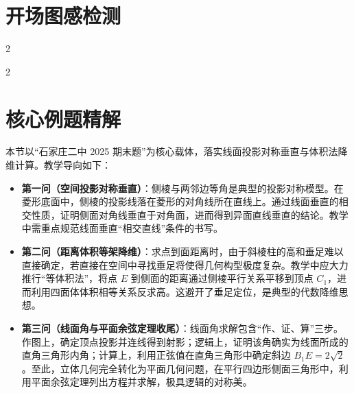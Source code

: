 \documentclass[11pt,a4paper]{ctexart}
\begin{document}
\newpage
\section{开场图感检测}

{\small \qSolidOpeningCubeRelationsStem}

\begin{paracol}{2}
\switchcolumn
{}
\end{paracol}

\par\vspace{1.0em}\par\vspace{1.0em}

{\small \qSolidOpeningPyramidProjectionStem}

\begin{paracol}{2}
\switchcolumn
{}
\end{paracol}

\newpage
\section{核心例题精解}

本节以“石家庄二中 2025 期末题”为核心载体，落实线面投影对称垂直与体积法降维计算。教学导向如下：
\begin{itemize}
  \item \textbf{第一问（空间投影对称垂直）}：侧棱与两邻边等角是典型的投影对称模型。在菱形底面中，侧棱的投影线落在菱形的对角线所在直线上。通过线面垂直的相交性质，证明侧面对角线垂直于对角面，进而得到异面直线垂直的结论。教学中需重点规范线面垂直“相交直线”条件的书写。
  \item \textbf{第二问（距离体积等架降维）}：求点到面距离时，由于斜棱柱的高和垂足难以直接确定，若直接在空间中寻找垂足将使得几何构型极度复杂。教学中应大力推行“等体积法”，将点 $E$ 到侧面的距离通过侧棱平行关系平移到顶点 $C_1$，进而利用四面体体积相等关系反求高。这避开了垂足定位，是典型的代数降维思想。
  \item \textbf{第三问（线面角与平面余弦定理收尾）}：线面角求解包含“作、证、算”三步。作图上，确定顶点投影并连线得到射影；逻辑上，证明该角确实为线面所成的直角三角形内角；计算上，利用正弦值在直角三角形中确定斜边 $B_1E = 2\sqrt{2}$。至此，立体几何完全转化为平面几何问题，在平行四边形侧面三角形中，利用平面余弦定理列出方程并求解，极具逻辑的对称美。
\end{itemize}
\end{document}

